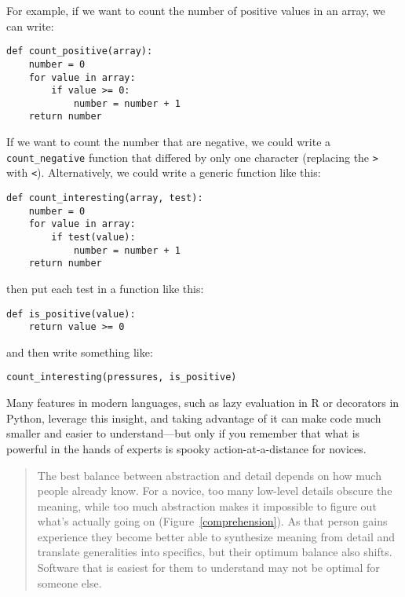 \documentclass[10pt,letterpaper]{article}
\begin{document}
For example,
if we want to count the number of positive values in an array,
we can write:

\begin{lstlisting}
def count_positive(array):
    number = 0
    for value in array:
        if value >= 0:
            number = number + 1
    return number
\end{lstlisting}

If we want to count the number that are negative,
we could write a \texttt{count\_negative} function that differed by only one character
(replacing the \texttt{>} with \texttt{<}).
Alternatively,
we could write a generic function like this:

\begin{lstlisting}
def count_interesting(array, test):
    number = 0
    for value in array:
        if test(value):
            number = number + 1
    return number
\end{lstlisting}

\noindent
then put each test in a function like this:

\begin{lstlisting}
def is_positive(value):
    return value >= 0
\end{lstlisting}

\noindent
and then write something like:

\begin{lstlisting}
count_interesting(pressures, is_positive)
\end{lstlisting}

Many features in modern languages,
such as lazy evaluation in R or decorators in Python,
leverage this insight,
and taking advantage of it can make code much smaller
and easier to understand---but only if you remember that
what is powerful in the hands of experts is spooky action-at-a-distance for novices.

\begin{quotation}
  The best balance between abstraction and detail
  depends on how much people already know.
  For a novice,
  too many low-level details obscure the meaning,
  while too much abstraction makes it impossible to figure out what's actually going on
  (Figure~\ref{comprehension}).
  As that person gains experience
  they become better able to synthesize meaning from detail
  and translate generalities into specifics,
  but their optimum balance also shifts.
  Software that is easiest for them to understand may not be optimal for someone else.
\end{quotation}
\end{document}
